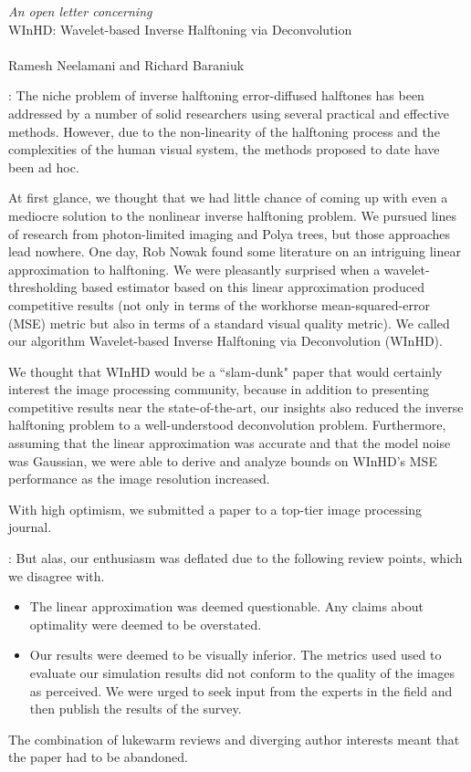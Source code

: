 \documentclass[11pt]{article}
\begin{document}
\begin{center}
\LARGE{\emph{An open letter concerning}\\WInHD: Wavelet-based Inverse Halftoning via Deconvolution}\\
\hfill\\
\large{Ramesh Neelamani and Richard Baraniuk}
\end{center}

\hfill

: The niche problem of inverse halftoning error-diffused halftones
has been addressed by a number of solid researchers using several
practical and effective methods. However, due to the non-linearity of
the halftoning process and the complexities of the human visual system,
the methods proposed to date have been ad hoc.

At first glance, we thought that we had little chance of coming up with
even a mediocre solution to the nonlinear inverse halftoning problem. We
pursued lines of research from photon-limited imaging and Polya trees,
but those approaches lead nowhere.  One day, Rob Nowak found some
literature on an intriguing linear approximation to halftoning. We were
pleasantly surprised when a wavelet-thresholding based estimator based
on this linear approximation produced competitive results (not only in
terms of the workhorse mean-squared-error (MSE) metric but also in terms
of a standard visual quality metric). We called our algorithm
Wavelet-based Inverse Halftoning via Deconvolution (WInHD).

We thought that WInHD would be a ``slam-dunk" paper that would certainly
interest the image processing community, because in addition to
presenting competitive results near the state-of-the-art, our insights
also reduced the inverse halftoning problem to a well-understood
deconvolution problem. Furthermore, assuming that the linear
approximation was accurate and that the model noise was Gaussian, we
were able to derive and analyze bounds on WInHD's MSE performance as the
image resolution increased.

With high optimism, we submitted a paper to a top-tier image processing
journal.

: But alas, our enthusiasm was deflated due to the following review
points, which we disagree with.
\begin{itemize}
\item The linear approximation was deemed questionable. Any claims about optimality were deemed to be overstated.
\item Our results were deemed to be visually inferior. The metrics used
used to evaluate our simulation results did not conform to the quality
of the images as perceived. We were urged to seek input from the experts
in the field and then publish the results of the survey.
\end{itemize}
The combination of lukewarm reviews and diverging author interests meant
that the paper had to be abandoned.
\end{document}

